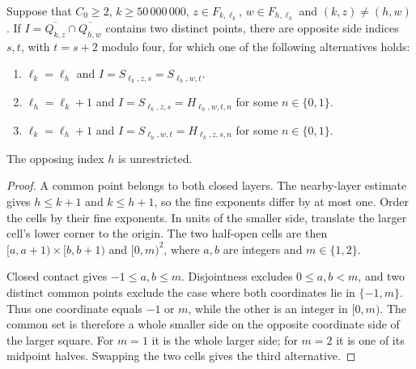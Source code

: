 \begin{lemma}
    \label{thm:area_law_fine_cell_contact}
    \leanok
    Suppose that $C_0\ge2$, $k\ge50\,000\,000$, $z\in F_{k,\ell_k}$,
    $w\in F_{h,\ell_h}$ and $(k,z)\ne(h,w)$. If
    $I=\overline{Q_{k,z}}\cap\overline{Q_{h,w}}$ contains two distinct
    points, there are opposite side indices $s,t$, with $t=s+2$ modulo
    four, for which one of the following alternatives holds:
    \begin{enumerate}
        \item $\ell_k=\ell_h$ and
              $I=S_{\ell_k,z,s}=S_{\ell_h,w,t}$.
        \item $\ell_h=\ell_k+1$ and
              $I=S_{\ell_k,z,s}=H_{\ell_h,w,t,n}$ for some $n\in\{0,1\}$.
        \item $\ell_k=\ell_h+1$ and
              $I=S_{\ell_h,w,t}=H_{\ell_k,z,s,n}$ for some $n\in\{0,1\}$.
    \end{enumerate}
    The opposing index $h$ is unrestricted.
\end{lemma}
\begin{proof}\leanok
    A common point belongs to both closed layers. The nearby-layer
    estimate gives $h\le k+1$ and $k\le h+1$, so the fine exponents
    differ by at most one. Order the cells by their fine exponents.
    In units of the smaller side, translate the larger cell's lower
    corner to the origin. The two half-open cells are then
    $\lbrack a,a+1)\times\lbrack b,b+1)$ and $\lbrack 0,m)^2$, where $a,b$ are integers
    and $m\in\{1,2\}$.

    Closed contact gives $-1\le a,b\le m$. Disjointness excludes
    $0\le a,b<m$, and two distinct common points exclude the case
    where both coordinates lie in $\{-1,m\}$. Thus one coordinate
    equals $-1$ or $m$, while the other is an integer in $\lbrack 0,m)$.
    The common set is therefore a whole smaller side on the opposite
    coordinate side of the larger square. For $m=1$ it is the whole
    larger side; for $m=2$ it is one of its midpoint halves. Swapping
    the two cells gives the third alternative.
\end{proof}
